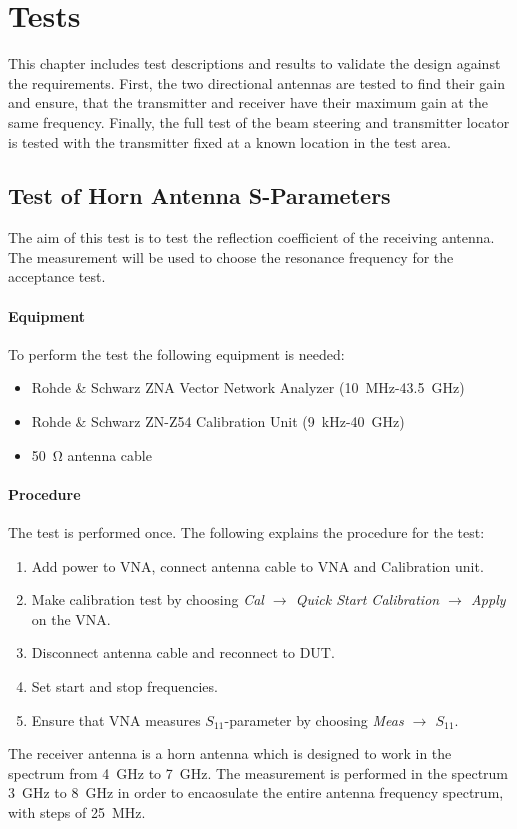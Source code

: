\chapter{Tests}
This chapter includes test descriptions and results to validate the design against the requirements. First, the two directional antennas are tested to find their gain and ensure, that the transmitter and receiver have their maximum gain at the same frequency. Finally, the full test of the beam steering and transmitter locator is tested with the transmitter fixed at a known location in the test area.

\section{Test of Horn Antenna S-Parameters} \label{s:sparam_test}
The aim of this test is to test the reflection coefficient of the receiving antenna. The measurement will be used to choose the resonance frequency for the acceptance test.

\subsubsection{Equipment}
To perform the test the following equipment is needed:
\begin{itemize}
    \item Rohde \& Schwarz ZNA Vector Network Analyzer (\SI{10}{\mega\hertz}-\SI{43.5}{\giga\hertz})
    \item Rohde \& Schwarz ZN-Z54 Calibration Unit (\SI{9}{\kilo\hertz}-\SI{40}{\giga\hertz})
    \item \SI{50}{\ohm} antenna cable
\end{itemize}

\subsubsection{Procedure}
The test is performed once. The following explains the procedure for the test:
\begin{enumerate}
    \item Add power to VNA, connect antenna cable to VNA and Calibration unit.
    \item Make calibration test by choosing \textit{Cal $\rightarrow$ Quick Start Calibration $\rightarrow$ Apply} on the VNA.
    \item Disconnect antenna cable and reconnect to DUT.
    \item Set start and stop frequencies. 
    \item Ensure that VNA measures $S_{11}$-parameter by choosing \textit{Meas $\rightarrow$ $S_{11}$}.
\end{enumerate}
The receiver antenna is a horn antenna which is designed to work in the spectrum from \SI{4}{\giga\hertz} to \SI{7}{\giga\hertz}. The measurement is performed in the spectrum \SI{3}{\giga\hertz} to \SI{8}{\giga\hertz} in order to encaosulate the entire antenna frequency spectrum, with steps of \SI{25}{\mega\hertz}. 

